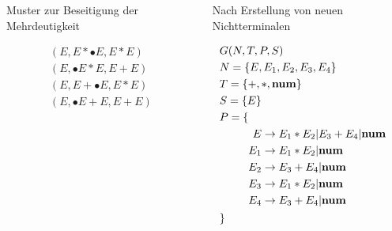 \documentclass[t]{beamer}
\begin{document}
	\begin{frame}
		\vspace{-1em}
		\begin{columns}[T]
			\begin{column}{0.33\textwidth}
				\centering
				\begin{block}{Muster zur Beseitigung der Mehrdeutigkeit}
					\begin{minipage}[t][7.5cm]{\linewidth}
						\vspace{-1em}
						\begin{align*}
						(E, E*\bullet{E}, E*E)
							\\
							(E, \bullet{E}*E, E+E) \\
							(E, E+\bullet{E}, E*E) \\
							(E, \bullet{E}+E, E+E)
						\end{align*}
					\end{minipage}
				\end{block}
			\end{column}
			\begin{column}{0.45\textwidth}
				\centering
				\begin{block}{Nach Erstellung von neuen Nichtterminalen}
					\begin{minipage}[t]{\linewidth}
						\vspace{-1em}
						\begin{align*}
							& G(N,T,P,S) \\
							& N = \{E, E_1, E_2, E_3, E_4\} \\
							& T = \{+, *, \bold{num}\} \\
							& S = \{E\} \\
							& P = \{ \begin{aligned}[t] \\
							E &\rightarrow E_1 * E_2 | E_3 + E_4 | \bold{num} \\
							E_1 &\rightarrow E_1 * E_2 | \bold{num} \\
							E_2 &\rightarrow E_3 + E_4 | \bold{num} \\
							E_3 &\rightarrow E_1 * E_2 | \bold{num} \\
							E_4 &\rightarrow E_3 + E_4 | \bold{num}
							\end{aligned} \\
							& \}
						\end{align*}
					\end{minipage}
				\end{block}
			\end{column}
		\end{columns}
	\end{frame}
\end{document}
